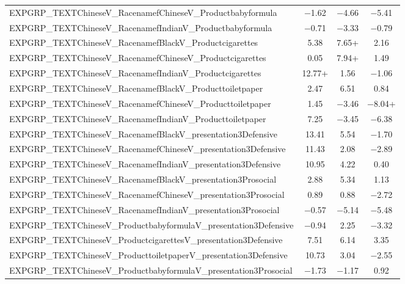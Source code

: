 \documentclass[]{report}
\begin{document}
\begin{table}
{\begin{tabular}[t]{lccc}
		EXPGRP\_TEXTChineseV\_RacenamefChineseV\_Productbabyformula & \num{-1.62} & \num{-4.66} & \num{-5.41}\\
		EXPGRP\_TEXTChineseV\_RacenamefIndianV\_Productbabyformula & \num{-0.71} & \num{-3.33} & \num{-0.79}\\
		EXPGRP\_TEXTChineseV\_RacenamefBlackV\_Productcigarettes & \num{5.38} & \num{7.65}+ & \num{2.16}\\
		EXPGRP\_TEXTChineseV\_RacenamefChineseV\_Productcigarettes & \num{0.05} & \num{7.94}+ & \num{1.49}\\
		EXPGRP\_TEXTChineseV\_RacenamefIndianV\_Productcigarettes & \num{12.77}+ & \num{1.56} & \num{-1.06}\\
		EXPGRP\_TEXTChineseV\_RacenamefBlackV\_Producttoiletpaper & \num{2.47} & \num{6.51} & \num{0.84}\\
		EXPGRP\_TEXTChineseV\_RacenamefChineseV\_Producttoiletpaper & \num{1.45} & \num{-3.46} & \num{-8.04}+\\
		EXPGRP\_TEXTChineseV\_RacenamefIndianV\_Producttoiletpaper & \num{7.25} & \num{-3.45} & \num{-6.38}\\
		EXPGRP\_TEXTChineseV\_RacenamefBlackV\_presentation3Defensive & \num{13.41} & \num{5.54} & \num{-1.70}\\
		EXPGRP\_TEXTChineseV\_RacenamefChineseV\_presentation3Defensive & \num{11.43} & \num{2.08} & \num{-2.89}\\
		EXPGRP\_TEXTChineseV\_RacenamefIndianV\_presentation3Defensive & \num{10.95} & \num{4.22} & \num{0.40}\\
		EXPGRP\_TEXTChineseV\_RacenamefBlackV\_presentation3Prosocial & \num{2.88} & \num{5.34} & \num{1.13}\\
		EXPGRP\_TEXTChineseV\_RacenamefChineseV\_presentation3Prosocial & \num{0.89} & \num{0.88} & \num{-2.72}\\
		EXPGRP\_TEXTChineseV\_RacenamefIndianV\_presentation3Prosocial & \num{-0.57} & \num{-5.14} & \num{-5.48}\\
		EXPGRP\_TEXTChineseV\_ProductbabyformulaV\_presentation3Defensive & \num{-0.94} & \num{2.25} & \num{-3.32}\\
		EXPGRP\_TEXTChineseV\_ProductcigarettesV\_presentation3Defensive & \num{7.51} & \num{6.14} & \num{3.35}\\
		EXPGRP\_TEXTChineseV\_ProducttoiletpaperV\_presentation3Defensive & \num{10.73} & \num{3.04} & \num{-2.55}\\
		EXPGRP\_TEXTChineseV\_ProductbabyformulaV\_presentation3Prosocial & \num{-1.73} & \num{-1.17} & \num{0.92}\\

\end{tabular}}
\end{table}
\end{document}
